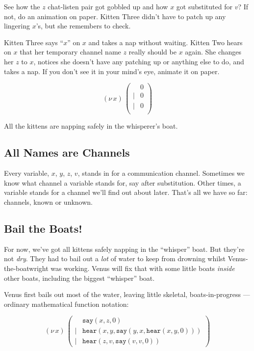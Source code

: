 \documentclass[10pt,oneside,x11names]{article}
\newcommand\napping    [0]{0}
\newcommand\whispering [2]{(\nu\,#1)\,{#2}}
\theoremstyle{definition}
\theoremstyle{warning}
\begin{document}
See how the \(z\) chat-listen pair got gobbled up and how \(x\) got
substituted for \(v\)? If not, do an animation on paper. Kitten
Three didn't have to patch up any lingering \(x\)'s, but she
remembers to check.

Kitten Three says ``\(x\)'' on \(x\) and takes a nap without waiting.
Kitten Two hears on \(x\) that her temporary channel name \(z\) really
should be \(x\) again. She changes her \(z\) to \(x\), notices she
doesn't have any patching up or anything else to do, and takes a
nap. If you don't see it in your mind's eye, animate it on paper.

\begin{equation}
\whispering{x}{\left(
\begin{array}{clll}
 {}     & \napping   \\
 \vert  & {\napping} \\
 \vert  & {\napping} \\
\end{array}\right)}
\end{equation}

All the kittens are napping safely in the whisperer's boat.

\subsection{All Names are Channels}
\label{sec:org2ea80cb}

Every variable, \(x\), \(y\), \(z\), \(v\), stands in for a communication
channel. Sometimes we know what channel a variable stands for, say
after substitution. Other times, a variable stands for a channel
we'll find out about later. That's all we have so far: channels,
known or unknown.

\subsection{Bail the Boats!}
\label{sec:orgb4bd1e8}

For now, we've got all kittens safely napping in the ``whisper''
boat. But they're not \emph{dry}. They had to bail out a \emph{lot} of water
to keep from drowning whilst Venus-the-boatwright was working.
Venus will fix that with some little boats \emph{inside} other boats,
including the biggest ``whisper'' boat.

Venus first bails out most of the water, leaving little skeletal,
boats-in-progress --- ordinary mathematical function notation:

\begin{equation}
\whispering{x}{\left(
\begin{array}{clll}
 {}     & \texttt{say} (x, z, \napping) \\
 \vert  & \texttt{hear}(x, y, \texttt{say}(y, x, \texttt{hear}(x, y, \napping))) \\
 \vert  & \texttt{hear}(z, v, \texttt{say}(v, v, \napping))
\end{array}\right)}
\end{equation}
\end{document}
